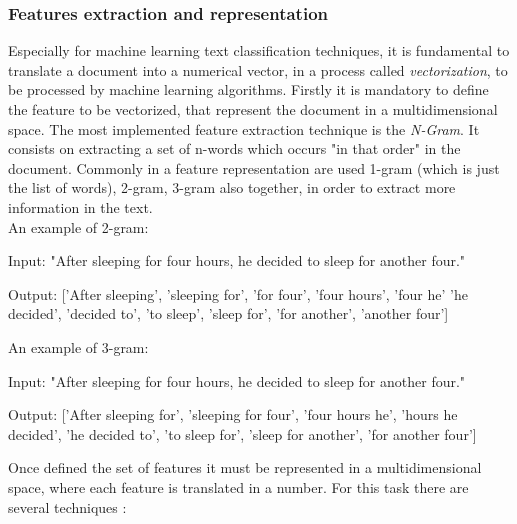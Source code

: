 \subsubsection{Features extraction and representation}
Especially for machine learning text classification techniques, it is fundamental to translate a document into a numerical vector, in a process called \textit{vectorization}, to be processed by machine learning algorithms. Firstly it is mandatory to define the feature to be vectorized, that represent the document in a multidimensional space. The most implemented feature extraction technique is the \textit{N-Gram}. It consists on extracting a set of n-words which occurs "in that order" in the document. Commonly in a feature representation are used 1-gram (which is just the list of words), 2-gram, 3-gram also together, in order to extract more information in the text.\\
An example of 2-gram:
\begin{description}
	\item Input: "After sleeping for four hours, he decided to sleep for another four."
	\item Output: ['After sleeping', 'sleeping for', 'for four', 'four hours', 'four he' 'he decided', 'decided to', 'to sleep', 'sleep for', 'for another', 'another four']
\end{description}
An example of 3-gram:
\begin{description}
	\item Input: "After sleeping for four hours, he decided to sleep for another four."
	\item Output: ['After sleeping for', 'sleeping for four', 'four hours he', 'hours he decided', 'he decided to', 'to sleep for', 'sleep for another', 'for another four']
\end{description}
Once defined the set of features it must be represented in a multidimensional space, where each feature is translated in a number. For this task there are several techniques \cite{DBLP:journals/corr/abs-1904-08067}:
